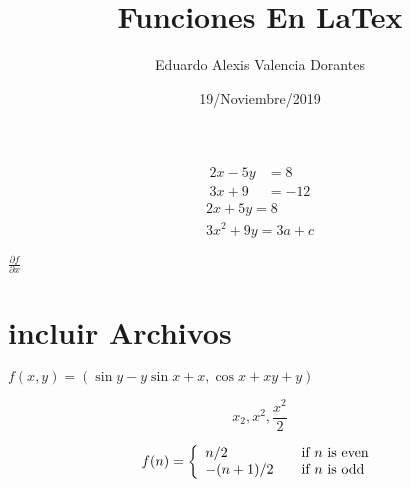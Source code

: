 \documentclass{article}%
\title{Funciones En LaTex}
\author{Eduardo Alexis Valencia Dorantes}
\date{19/Noviembre/2019}
\begin{document}
	\begin{titlepage}
		\maketitle
		\begin{align*}
		2x - 5y &= 8\\
		3x +9 &= -12
		\end{align*}
\begin{gather*}
2x + 5y = 8\\
3x^2 + 9y = 3a +c
\end{gather*}

\begin{flushleft}%
$\frac{\partial
f}{\partial x}$	
\end{flushleft}

\section*{incluir Archivos}
%
	
$ f(x,y)=(\sin y-y\sin x+x,\cos x+xy+y) $

\[ x_{2}, x^{2} ,\frac{x^{2}}{2} \]

\[f(n) = 
\left\{\begin{array}{l
l}n/2 & \quad \mbox{if $n$
is even}\\-(n+1)/2 & \quad
\mbox{if $n$ is odd}\\
\end{array} \right. \]
    \end{titlepage}
\end{document}
